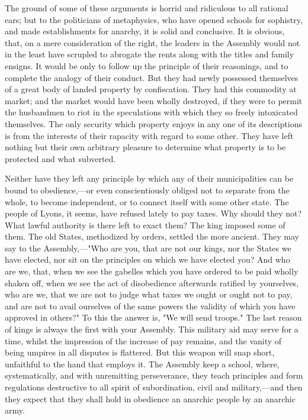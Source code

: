 The ground of some of these arguments is horrid and ridiculous to all rational ears; but to the politicians of metaphysics, who have opened schools for sophistry, and made establishments for anarchy, it is solid and conclusive. It is obvious, that, on a mere consideration of the right, the leaders in the Assembly would not in the least have scrupled to abrogate the rents along with the titles and family ensigns. It would be only to follow up the principle of their reasonings, and to complete the analogy of their conduct. But they had newly possessed themselves of a great body of landed property by confiscation. They had this commodity at market; and the market would have been wholly destroyed, if they were to permit the husbandmen to riot in the speculations with which they so freely intoxicated themselves. The only security which property enjoys in any one of its descriptions is from the interests of their rapacity with regard to some other. They have left nothing but their own arbitrary pleasure to determine what property is to be protected and what subverted.

Neither have they left any principle by which any of their municipalities can be bound to obedience,—or even conscientiously obliged not to separate from the whole, to become independent, or to connect itself with some other state. The people of Lyons, it seems, have refused lately to pay taxes. Why should they not? What lawful authority is there left to exact them? The king imposed some of them. The old States, methodized by orders, settled the more ancient. They may say to the Assembly,—"Who are you, that are not our kings, nor the States we have elected, nor sit on the principles on which we have elected you? And who are we, that, when we see the gabelles which you have ordered to be paid wholly shaken off, when we see the act of disobedience afterwards ratified by yourselves, who are we, that we are not to judge what taxes we ought or ought not to pay, and are not to avail ourselves of the same powers the validity of which you have approved in others?" To this the answer is, "We will send troops." The last reason of kings is always the first with your Assembly. This military aid may serve for a time, whilst the impression of the increase of pay remains, and the vanity of being umpires in all disputes is flattered. But this weapon will snap short, unfaithful to the hand that employs it. The Assembly keep a school, where, systematically, and with unremitting perseverance, they teach principles and form regulations destructive to all spirit of subordination, civil and military,—and then they expect that they shall hold in obedience an anarchic people by an anarchic army.

